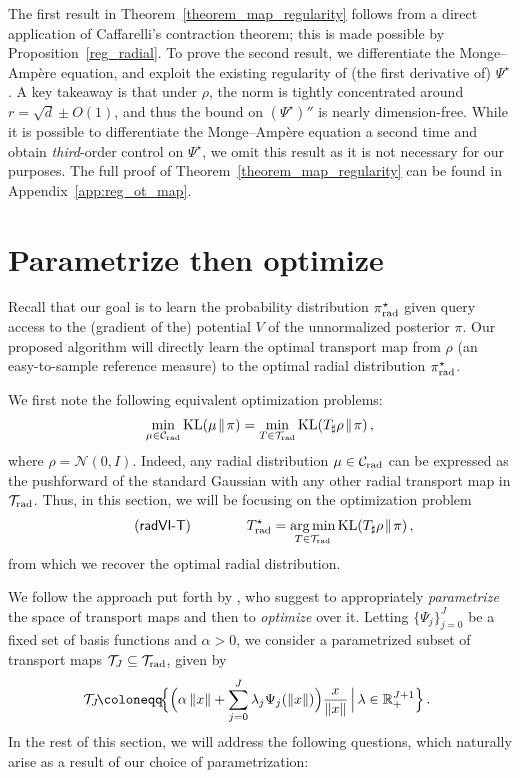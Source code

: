 \documentclass[twoside]{article}
\newcommand{\cC}{\mathcal{C}}
\newcommand{\cN}{\mathcal{N}}
\newcommand{\cT}{\mathcal{T}}
\newcommand{\1}{\mathds{1}}
\newcommand{\kl}[2]{\KL(#1 \!\;\|\; \!#2)}
\newcommand*{\norm}[1]{\left\|#1\right\|}
\newcommand{\R}{\mathbb{R}}
\newcommand*{\defeq}{\coloneqq}
\DeclareMathOperator*{\argmin}{arg\,min}
\DeclareMathOperator*{\KL}{KL}
\newcommand{\pirad}{\pi_{\rm rad}}
\newcommand{\Crad}{\cC_{\rm rad}}
\theoremstyle{plain}
\theoremstyle{definition}
\theoremstyle{remark}
\begin{document}
The first result in Theorem~\ref{theorem_map_regularity} follows from a direct application of Caffarelli's contraction theorem; this is made possible by Proposition~\ref{reg_radial}. To prove the second result, we differentiate the Monge--Amp\`ere equation, and exploit the existing regularity of (the first derivative of) $\Psi^\star$. {A key takeaway is that under $\rho$, the norm is tightly concentrated around $r = \sqrt d \pm O(1)$, and thus the bound on $(\Psi^\star)''$ is nearly dimension-free.} While it is possible to differentiate the Monge--Amp\`ere equation a second time and obtain \emph{third}-order control on $\Psi^\star$, we omit this result as it is not necessary for our purposes. The full proof of Theorem~\ref{theorem_map_regularity} can be found in Appendix~\ref{app:reg_ot_map}.



\section{Parametrize then optimize}\label{sec:comp_guarantees}
Recall that our goal is to learn the probability distribution $\pirad^\star$ given query access to the (gradient of the) potential $V$ of the unnormalized posterior $\pi$. Our proposed algorithm will directly learn the optimal transport map from $\rho$ (an easy-to-sample reference measure) to the optimal radial distribution $\pirad^\star$.

We first note the following equivalent optimization problems:
\begin{align*}
    \min_{\mu \in \Crad} \kl{\mu}{\pi} = \min_{T \in \cT_{\rm rad}}\kl{T_\sharp \rho}{\pi}\,,
\end{align*}
where $\rho = \cN(0,I)$. Indeed, any radial distribution $\mu \in \Crad$ can be expressed as the pushforward of the standard Gaussian with any other radial transport map in $\cT_{\rm rad}$. Thus, in this section, we will be focusing on the optimization problem
\begin{align}\label{eq:radvi_t}\tag{$\mathsf{radVI}$-$\mathsf{T}$}
    \qquad \qquad T_{\rm rad}^\star = \argmin_{T \in \cT_{\rm rad}}\kl{T_\sharp\rho}{\pi}\,,
\end{align}
from which we recover the optimal radial distribution.

We follow the approach put forth by \cite{JiaChePoo24MFVI}, who suggest to appropriately \emph{parametrize} the space of transport maps and then to \emph{optimize} over it. Letting {$\{\Psi_j\}_{j=0}^J$} be a fixed set of basis functions and $\alpha > 0$, we consider a parametrized subset of transport maps $\cT_J \subseteq \cT_{\rm rad}$, given by
\begin{align}
\!\!\cT_{J}\!\defeq\!{\Bigl\{ \Bigl(\alpha\,\|
x\| + \sum_{j=0}^{J}\lambda_j \Psi_j(\| x \|)\Bigr) \frac{x}{\norm x} \ \! \Big|\!  \ \lambda \in \R^{J+1}_+ \Bigr\}}\,.
\end{align}
In the rest of this section, we will address the following questions, which naturally arise as a result of our choice of parametrization:
\end{document}
